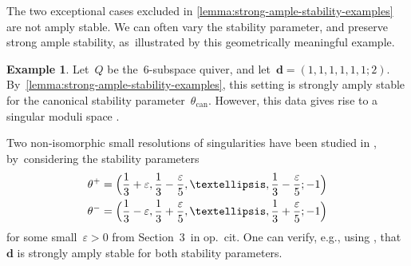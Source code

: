 \documentclass[11pt]{article}
\let\epsilon\varepsilon
\theoremstyle{plain}
\theoremstyle{definition}
\newtheorem{example}[theorem]{Example}
\newcommand\can{\ensuremath{\mathrm{can}}}
\newcommand\tuple[1]{\ensuremath{{\boldsymbol{#1}}}}
\begin{document}
The two exceptional cases excluded in \cref{lemma:strong-ample-stability-examples}
are not amply stable.
We can often vary the stability parameter,
and preserve strong ample stability, as~illustrated by this geometrically meaningful example.
\begin{example}
Let~$Q$ be the~6-subspace quiver,
and let~$\tuple{d}=(1,1,1,1,1,1;2)$. By~\cref{lemma:strong-ample-stability-examples},
this setting is strongly amply stable for the canonical stability parameter~$\theta_\can$.
However, this data gives rise to a singular moduli space \cite{MR3778138,2202.08601}.

Two non-isomorphic small resolutions of singularities have been studied in \cite{MR3778138}, by~considering the stability parameters
\begin{equation*}
\begin{aligned}
\theta^+&=\Bigl( \frac{1}{3}+\epsilon,\frac{1}{3}-\frac{\epsilon}{5},\ldots,\frac{1}{3}-\frac{\epsilon}{5};-1 \Bigr) \\
\theta^-&=\Bigl( \frac{1}{3}-\epsilon,\frac{1}{3}+\frac{\epsilon}{5},\ldots,\frac{1}{3}+\frac{\epsilon}{5};-1 \Bigr)
\end{aligned}
\end{equation*}
for some small~$\epsilon>0$
from Section~3~in op.~cit.
One can verify, e.g., using \cite{quivertools},
that~$\tuple{d}$ is strongly amply stable for both stability parameters.
\end{example}
\end{document}
